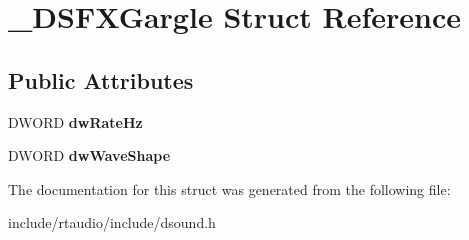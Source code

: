 \hypertarget{struct___d_s_f_x_gargle}{}\section{\+\_\+\+D\+S\+F\+X\+Gargle Struct Reference}
\label{struct___d_s_f_x_gargle}
\subsection*{Public Attributes}
\begin{DoxyCompactItemize}
\item 
D\+W\+O\+RD {\bfseries dw\+Rate\+Hz}\hypertarget{struct___d_s_f_x_gargle_a8e5ddfb6d016063fca23dadb5be73cc8}{}\label{struct___d_s_f_x_gargle_a8e5ddfb6d016063fca23dadb5be73cc8}

\item 
D\+W\+O\+RD {\bfseries dw\+Wave\+Shape}\hypertarget{struct___d_s_f_x_gargle_ac8850af813d2f898f2d20fba794b8caa}{}\label{struct___d_s_f_x_gargle_ac8850af813d2f898f2d20fba794b8caa}

\end{DoxyCompactItemize}


The documentation for this struct was generated from the following file\+:\begin{DoxyCompactItemize}
\item 
include/rtaudio/include/dsound.\+h\end{DoxyCompactItemize}
